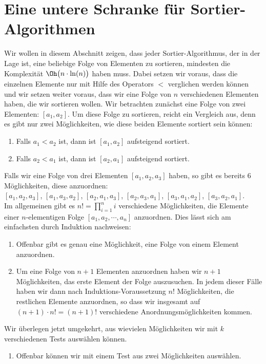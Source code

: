 \section{Eine untere Schranke f\"ur Sortier-Algorithmen}
Wir wollen in diesem Abschnitt zeigen, dass jeder Sortier-Algorithmus, der in der Lage
ist,  eine beliebige Folge von Elementen zu sortieren, mindesten die Komplexit\"at
 $\Oh\bigl(n \cdot \ln(n)\bigr)$ haben muss.  Dabei setzen wir voraus, dass die einzelnen Elemente nur mit
 Hilfe des Operators $<$ verglichen werden k\"onnen und wir setzen weiter voraus,
dass wir eine Folge von $n$ verschiedenen Elementen haben, die wir sortieren wollen.  Wir betrachten zun\"achst
eine Folge von zwei Elementen: $[a_1, a_2]$.  Um diese Folge zu sortieren, reicht ein Vergleich aus, denn es
gibt nur zwei M\"oglichkeiten, wie diese beiden Elemente sortiert sein k\"onnen:  
\begin{enumerate}
\item Falls $a_1 < a_2$ ist, dann ist $[a_1, a_2]$ aufsteigend sortiert.
\item Falls $a_2 < a_1$ ist, dann ist $[a_2, a_1]$ aufsteigend sortiert.
\end{enumerate}
Falls wir eine Folge von drei Elementen $[a_1,a_2,a_3]$ haben, so gibt es bereits $6$ M\"oglichkeiten, diese
anzuordnen:
\\[0.2cm]
\hspace*{1.3cm}
$[a_1,a_2,a_3]$, \quad
$[a_1,a_3,a_2]$, \quad
$[a_2,a_1,a_3]$, \quad
$[a_2,a_3,a_1]$, \quad
$[a_3,a_1,a_2]$, \quad
$[a_3,a_2,a_1]$. \quad
\\[0.2cm]
Im allgemeinen gibt es $n! = \prod\limits_{i=1}^n i$ verschiedene M\"oglichkeiten, die Elemente einer
$n$-elementigen Folge $[a_1,a_2,\cdots,a_n]$ anzuordnen. Dies l\"asst sich am einfachsten durch Induktion
nachweisen: 
\begin{enumerate}
\item Offenbar gibt es genau eine M\"oglichkeit, eine Folge von einem Element anzuordnen.
\item Um eine Folge von $n+1$ Elementen anzuordnen haben wir $n+1$ M\"oglichkeiten, das erste Element
      der Folge auszusuchen.  In jedem dieser F\"alle haben wir dann nach Induktions-Voraussetzung
      $n!$ M\"oglichkeiten, die restlichen Elemente anzuordnen, so dass wir insgesamt auf 
      $(n+1) \cdot n! = (n+1)!$ verschiedene Anordnungsm\"oglichkeiten kommen.
\end{enumerate}
Wir \"uberlegen jetzt umgekehrt, aus wievielen M\"oglichkeiten wir mit $k$ verschiedenen Tests ausw\"ahlen k\"onnen.
\begin{enumerate}
\item Offenbar k\"onnen wir mit einem Test aus zwei M\"oglichkeiten ausw\"ahlen.
\end{enumerate}

